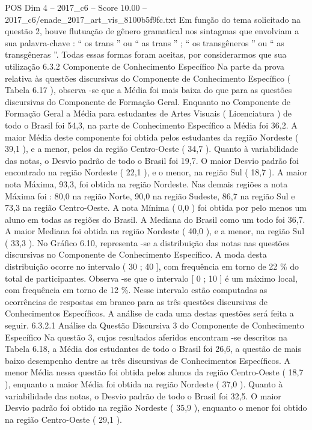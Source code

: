\begin{textsample}{POS Dim 4 – 2017\_c6 – Score 10.00 – 2017\_c6/enade\_2017\_art\_vis\_8100b5f9fc.txt}
Em função do tema solicitado na questão 2, houve flutuação de gênero gramatical nos sintagmas que envolviam a sua palavra-chave : “ os trans ” ou “ as trans ” ; “ os transgêneros ” ou “ as transgêneras ”.
Todas essas formas foram aceitas, por considerarmos que sua utilização 6.3.2 Componente de Conhecimento Específico Na parte da prova relativa às questões discursivas do Componente de Conhecimento Específico ( Tabela 6.17 ), observa -se que a Média foi mais baixa do que para as questões discursivas do Componente de Formação Geral.
Enquanto no Componente de Formação Geral a Média para estudantes de Artes Visuais ( Licenciatura ) de todo o Brasil foi 54,3, na parte de Conhecimento Específico a Média foi 36,2.
A maior Média deste componente foi obtida pelos estudantes da região Nordeste ( 39,1 ), e a menor, pelos da região Centro-Oeste ( 34,7 ).
Quanto à variabilidade das notas, o Desvio padrão de todo o Brasil foi 19,7.
O maior Desvio padrão foi encontrado na região Nordeste ( 22,1 ), e o menor, na região Sul ( 18,7 ).
A maior nota Máxima, 93,3, foi obtida na região Nordeste.
Nas demais regiões a nota Máxima foi : 80,0 na região Norte, 90,0 na região Sudeste, 86,7 na região Sul e 73,3 na região Centro-Oeste.
A nota Mínima ( 0,0 ) foi obtida por pelo menos um aluno em todas as regiões do Brasil.
A Mediana do Brasil como um todo foi 36,7.
A maior Mediana foi obtida na região Nordeste ( 40,0 ), e a menor, na região Sul ( 33,3 ).
No Gráfico 6.10, representa -se a distribuição das notas nas questões discursivas no Componente de Conhecimento Específico.
A moda desta distribuição ocorre no intervalo ( 30 ; 40 ], com frequência em torno de 22 \% do total de participantes.
Observa -se que o intervalo [ 0 ; 10 ] é um máximo local, com frequência em torno de 12 \%.
Nesse intervalo estão computadas as ocorrências de respostas em branco para as três questões discursivas de Conhecimentos Específicos.
A análise de cada uma destas questões será feita a seguir. 6.3.2.1 Análise da Questão Discursiva 3 do Componente de Conhecimento Específico Na questão 3, cujos resultados aferidos encontram -se descritos na Tabela 6.18, a Média dos estudantes de todo o Brasil foi 26,6, a questão de mais baixo desempenho dentre as três discursivas de Conhecimentos Específicos.
A menor Média nessa questão foi obtida pelos alunos da região Centro-Oeste ( 18,7 ), enquanto a maior Média foi obtida na região Nordeste ( 37,0 ).
Quanto à variabilidade das notas, o Desvio padrão de todo o Brasil foi 32,5.
O maior Desvio padrão foi obtido na região Nordeste ( 35,9 ), enquanto o menor foi obtido na região Centro-Oeste ( 29,1 ).

\end{textsample}
